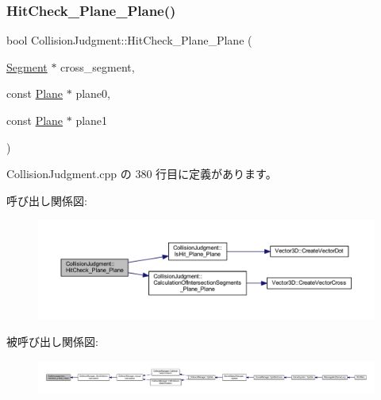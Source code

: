 \subsubsection{\texorpdfstring{Hit\+Check\+\_\+\+Plane\+\_\+\+Plane()}{HitCheck\_Plane\_Plane()}}
{\footnotesize\ttfamily bool Collision\+Judgment\+::\+Hit\+Check\+\_\+\+Plane\+\_\+\+Plane (\begin{DoxyParamCaption}\item[{\mbox{\hyperlink{class_segment}{Segment}} $\ast$}]{cross\+\_\+segment,  }\item[{const \mbox{\hyperlink{class_plane}{Plane}} $\ast$}]{plane0,  }\item[{const \mbox{\hyperlink{class_plane}{Plane}} $\ast$}]{plane1 }\end{DoxyParamCaption})\hspace{0.3cm}{\ttfamily [static]}}



 Collision\+Judgment.\+cpp の 380 行目に定義があります。

呼び出し関係図\+:\nopagebreak
\begin{figure}[H]
\begin{center}
\leavevmode
\includegraphics[width=350pt]{class_collision_judgment_a01ad684bee6964d4315df1a23ac3ec7d_cgraph}
\end{center}
\end{figure}
被呼び出し関係図\+:
\nopagebreak
\begin{figure}[H]
\begin{center}
\leavevmode
\includegraphics[width=350pt]{class_collision_judgment_a01ad684bee6964d4315df1a23ac3ec7d_icgraph}
\end{center}
\end{figure}
\mbox{\label{class_collision_judgment_a473c94087dc9cd3937016ccba5f12abd}} 
